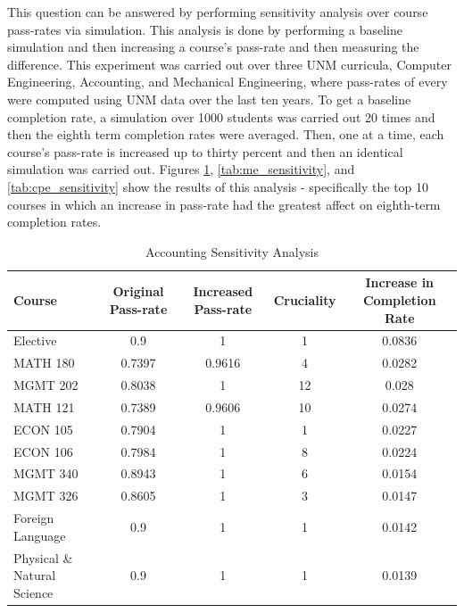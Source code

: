 \documentclass[botnum, fleqn]{unmeethesis}
\begin{document}
This question can be answered by performing sensitivity analysis over course pass-rates via simulation. This analysis is done by performing a baseline simulation and then increasing a course's pass-rate and then measuring the difference. This experiment was carried out over three UNM curricula, Computer Engineering, Accounting, and Mechanical Engineering, where pass-rates of every were computed using UNM data over the last ten years. To get a baseline completion rate, a simulation over 1000 students was carried out 20 times and then the eighth term completion rates were averaged. Then, one at a time, each course's pass-rate is increased up to thirty percent and then an identical simulation was carried out. Figures \ref{tab:accounting_sensitivity}, \ref{tab:me_sensitivity}, and \ref{tab:cpe_sensitivity} show the results of this analysis - specifically the top 10 courses in which an increase in pass-rate had the greatest affect on eighth-term completion rates.

\begin{table}[!h]
\tiny
\begin{tabular}{l*{4}{c}}
Course & Original Pass-rate & Increased Pass-rate & Cruciality & Increase in Completion Rate \\
\hline
Elective & 0.9 & 1 & 1 & 0.0836 \\
MATH 180 & 0.7397 & 0.9616 & 4 & 0.0282 \\
MGMT 202 & 0.8038 & 1 & 12 & 0.028 \\
MATH 121 & 0.7389 & 0.9606 & 10 & 0.0274 \\
ECON 105 & 0.7904 & 1 & 1 & 0.0227 \\
ECON 106 & 0.7984 & 1 & 8 & 0.0224 \\
MGMT 340 & 0.8943 & 1 & 6 & 0.0154 \\
MGMT 326 & 0.8605 & 1 & 3 & 0.0147 \\
Foreign Language & 0.9 & 1 & 1 & 0.0142 \\
Physical \& Natural Science & 0.9 & 1 & 1 & 0.0139 \\
\end{tabular}
\caption{Accounting Sensitivity Analysis} 
\label{tab:accounting_sensitivity}
\end{table}
\end{document}
